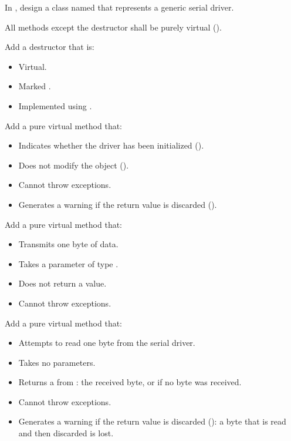 In , design a class named  that
represents a generic serial driver.

All methods except the destructor shall be purely virtual ().

Add a destructor that is:
\begin{itemize}
  \item Virtual.
  \item Marked .
  \item Implemented using .
\end{itemize}

Add a pure virtual method  that:
\begin{itemize}
  \item Indicates whether the driver has been initialized ().
  \item Does not modify the object ().
  \item Cannot throw exceptions.
  \item Generates a warning if the return value is discarded (\code{[[nodiscard]]}).
\end{itemize}

Add a pure virtual method  that:
\begin{itemize}
  \item Transmits one byte of data.
  \item Takes a parameter of type .
  \item Does not return a value.
  \item Cannot throw exceptions.
\end{itemize}

Add a pure virtual method  that:
\begin{itemize}
  \item Attempts to read one byte from the serial driver.
  \item Takes no parameters.
  \item Returns a  from : the received byte, or
     if no byte was received.
  \item Cannot throw exceptions.
  \item Generates a warning if the return value is discarded (\code{[[nodiscard]]}): a byte that is
    read and then discarded is lost.
\end{itemize}

